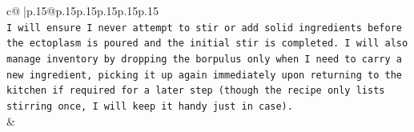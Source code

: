 \documentclass{article}
\begin{document}
{\begin{supertabular}{c@{$\;$}|p{.15\linewidth}@{}p{.15\linewidth}p{.15\linewidth}p{.15\linewidth}p{.15\linewidth}p{.15\linewidth}}
{{{\\ 
\texttt{I will ensure I never attempt to stir or add solid ingredients before the ectoplasm is poured and the initial stir is completed. I will also manage inventory by dropping the borpulus only when I need to carry a new ingredient, picking it up again immediately upon returning to the kitchen if required for a later step (though the recipe only lists stirring once, I will keep it handy just in case).} \\
            }
        }
    }
    & \\ \\

\end{supertabular}
}
\end{document}

